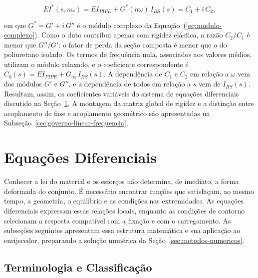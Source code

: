 \documentclass[arial,centeredequations,english,brazilian,oneside,section=TITLE]{ifes8}
\begin{document}
\begin{equation}
  \label{eq:ve-rigidez-complexa}
  EI^{*}(s, n\omega) = EI_{PIPE} + G^{*}(n\omega)\,I_{BS}(s) = C_1 + i\,C_2,
\end{equation}

em que $G^{*} = G' + i\,G''$ é o módulo complexo da Equação~(\ref{eq:modulo-complexo}).
Como o duto contribui apenas com rigidez elástica, a razão $C_2/C_1$ é menor que
$G''/G'$: o fator de perda da seção composta é menor que o do poliuretano isolado. Os
termos de frequência nula, associados aos valores médios, utilizam o módulo relaxado, e o
coeficiente correspondente é $C_0(s) = EI_{PIPE} + G_{\infty}\,I_{BS}(s)$.
A dependência de $C_1$ e $C_2$ em relação a
$\omega$ vem dos módulos $G'$ e $G''$, e a dependência de todos em relação a $s$ vem de
$I_{BS}(s)$. Resultam, assim, os coeficientes variáveis do sistema de equações
diferenciais discutido na Seção~\ref{sec:equacoes-diferenciais}. A montagem da matriz
global de rigidez e a distinção entre acoplamento de fase e acoplamento geométrico são
apresentadas na Subseção~\ref{sec:governo-linear-frequencia}.


\section{Equações Diferenciais}
\label{sec:equacoes-diferenciais}

Conhecer a lei do material e os esforços não determina, de imediato, a forma
deformada do conjunto. É necessário encontrar funções que satisfaçam, ao mesmo
tempo, a geometria, o equilíbrio e as condições nas extremidades. As equações
diferenciais expressam essas relações locais, enquanto as condições de contorno
selecionam a resposta compatível com a fixação e com o carregamento.
As subseções seguintes apresentam essa estrutura matemática e sua aplicação
ao enrijecedor, preparando a solução numérica da Seção~\ref{sec:metodos-numericos}.
 
\subsection{Terminologia e Classificação}
\label{sub:edo-classificacao}
 
\end{document}
